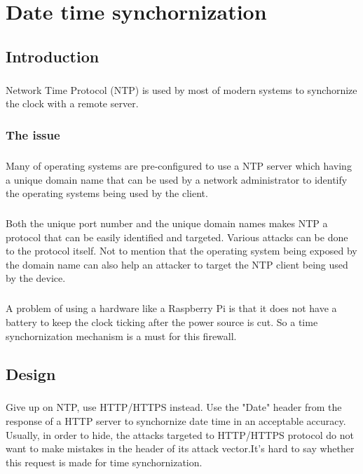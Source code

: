 \documentclass[mscthesis]{usiinfthesis}
\begin{document}
\chapter{Date time synchornization}
\section{Introduction}
\paragraph{}
Network Time Protocol (NTP) is used by most of modern systems to synchornize the clock with a remote server.
\subsection{The issue}
\paragraph{}
Many of operating systems are pre-configured to use a NTP server which having a unique domain name that can be used by a network administrator to identify the operating systems being used by the client.
\paragraph{}
Both the unique port number and the unique domain names makes NTP a protocol that can be easily identified and targeted. Various attacks can be done to the protocol itself\citep{ntp:attack}. Not to mention that the operating system being exposed by the domain name can also help an attacker to target the NTP client being used by the device.
\paragraph{}
A problem of using a hardware like a Raspberry Pi is that it does not have a battery to keep the clock ticking after the power source is cut. So a time synchornization mechanism is a must for this firewall.

\section{Design}
\paragraph{}
Give up on NTP, use HTTP/HTTPS instead. Use the "Date" header from the response of a HTTP server to synchornize date time in an acceptable accuracy. Usually, in order to hide, the attacks targeted to HTTP/HTTPS protocol do not want to make mistakes in the header of its attack vector.It's hard to say whether this request is made for time synchornization.
\end{document}
